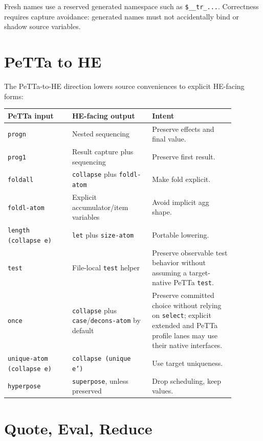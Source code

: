 \documentclass[11pt]{article}
\newcommand{\code}[1]{\texttt{#1}}
\newcommand{\HE}{\textup{HE}}
\newcommand{\PeTTa}{\textup{PeTTa}}
\begin{document}
Fresh names use a reserved generated namespace such as \code{\$\_\_tr\_...}.
Correctness requires capture avoidance: generated names must not accidentally
bind or shadow source variables.

\section{\PeTTa{} to \HE{}}

The \PeTTa{}-to-\HE{} direction lowers source conveniences to explicit
\HE{}-facing forms:

\begin{center}
\begin{tabular}{>{\raggedright\arraybackslash}p{0.25\linewidth}
                >{\raggedright\arraybackslash}p{0.31\linewidth}
                >{\raggedright\arraybackslash}p{0.32\linewidth}}
\toprule
\PeTTa{} input & \HE{}-facing output & Intent \\
\midrule
\code{progn} & Nested sequencing & Preserve effects and final value. \\
\code{prog1} & Result capture plus sequencing & Preserve first result. \\
\code{foldall} & \code{collapse} plus \code{foldl-atom} & Make fold explicit. \\
\code{foldl-atom} & Explicit accumulator/item variables & Avoid implicit agg shape. \\
\code{length (collapse e)} & \code{let} plus \code{size-atom} & Portable lowering. \\
\code{test} & File-local \code{test} helper &
Preserve observable test behavior without assuming a target-native
\PeTTa{} \code{test}. \\
\code{once} & \code{collapse} plus \code{case}/\code{decons-atom} by default &
Preserve committed choice without relying on \code{select}; explicit extended
and \PeTTa{} profile lanes may use their native interfaces. \\
\code{unique-atom (collapse e)} & \code{collapse (unique e')} & Use target uniqueness. \\
\code{hyperpose} & \code{superpose}, unless preserved & Drop scheduling, keep values. \\
\bottomrule
\end{tabular}
\end{center}

\section{Quote, Eval, Reduce}
\label{sec:quote}
\end{document}
